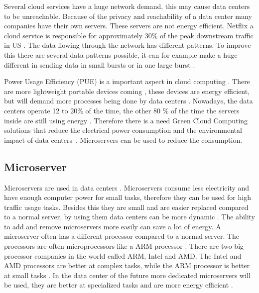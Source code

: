 \documentclass{sig-alternate-br}
\begin{document}
Several cloud services have a huge network demand, this may cause data centers to be unreachable. Because of the privacy and reachability of a data center many companies have their own servers. These servers are not energy efficient. \newline
Netflix a cloud service is responsible for approximately 30\% of the peak downstream traffic in US \cite{Adhikari:2012, computer-networking}. The data flowing through the network has different patterns. To improve this there are several data patterns possible, it can for example make a huge different in sending data in small bursts or in one large burst \cite{computer-networking}.

Power Usage Efficiency (PUE) is a important aspect in cloud computing \cite{beloglazov2012energy}. There are more lightweight portable devices coming \cite{Miettinen:2010:EEM:1863103.1863107}, these devices are energy efficient, but will demand more processes being done by data centers \cite{Miettinen:2010:EEM:1863103.1863107}. Nowadays, the data centers operate 12 to 20\% of the time, the other 80 \% of the time the servers inside are still using energy \cite{beloglazov2012energy}. Therefore there is a need Green Cloud Computing solutions that reduce the electrical power consumption and the environmental impact of data centers~\cite{beloglazov2012energy}. Microservers can be used to reduce the consumption.

\subsection{Microserver}
Microservers are used in data centers \cite{microserver}. Microservers consume less electricity and have enough computer power for small tasks, therefore they can be used for high traffic usage tasks. Besides this they are small and are easier replaced compared to a normal server, by using them data centers can be more dynamic \cite{microserver}. The ability to add and remove microservers more easily can save a lot of energy. \newline
A microserver often has a different processor compared to a normal server. The processors are often microprocessors like a ARM processor \cite{microserver}. There are two big processor companies in the world called ARM, Intel and AMD. The Intel and AMD processors are better at complex tasks, while the ARM processor is better at small tasks \cite{microserver}. In the data center of the future more dedicated microservers will be used, they are better at specialized tasks and are more energy efficient \cite{microserver}. 
\end{document}
